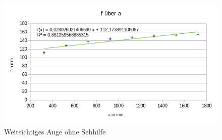 \documentclass[a4paper, 12pt]{article}
\begin{document}
\begin{figure}
\centering
\includegraphics[scale=0.7]{23.png}
\caption{Weitsichtiges Auge ohne Sehhilfe}
\label{Abb2.3}
\end{figure}
\end{document}
